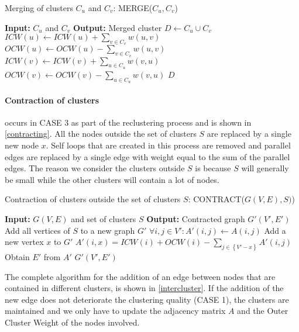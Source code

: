 \begin{algorithm}
\caption{Merging of clusters $C_u$ and $C_v$: MERGE($C_u,C_v$)}
\label{merging}
\begin{algorithmic}
\STATE \textbf{Input:} $C_u$ and $C_v$ 
\STATE \textbf{Output:} Merged cluster
\STATE $D \leftarrow C_u \cup C_v$
	\STATE $ICW(u) \leftarrow ICW(u) + \sum_{v \in C_v}{w(u,v)}$
	\STATE $OCW(u) \leftarrow OCW(u) - \sum_{v \in C_v}{w(u,v)}$
\ENDFOR
{}
	\STATE $ICW(v) \leftarrow ICW(v) + \sum_{u \in C_u}{w(v,u)}$
	\STATE $OCW(v) \leftarrow OCW(v) - \sum_{u \in C_u}{w(v,u)}$
\ENDFOR
\RETURN $D$
\end{algorithmic}
\end{algorithm}

\paragraph{Contraction of clusters} occurs in CASE 3 as part of the reclustering process and is shown in \autoref{contracting}. All the nodes outside the set of clusters $S$ are replaced by a single new node $x$. Self loops that are created in this process are removed and parallel edges are replaced by a single edge with weight equal to the sum of the parallel edges. The reason we consider the clusters outside $S$ is because $S$ will generally be small while the other clusters will contain a lot of nodes.

\begin{algorithm}
\caption{Contraction of clusters outside the set of clusters $S$: CONTRACT($G(V,E),S)$)}
\label{contracting}
\begin{algorithmic}
\STATE \textbf{Input:} $G(V,E)$ and set of clusters $S$ 
\STATE \textbf{Output:} Contracted graph $G'(V',E')$
\STATE Add all vertices of $S$ to a new graph $G'$
\STATE $\forall i,j \in V' : A'(i,j) \leftarrow A(i,j)$
\STATE Add a new vertex $x$ to $G'$
	\STATE $A'(i,x) = ICW(i) + OCW(i) - \sum_{j \in \left\{ V' - x \right\} }{A'(i,j)}$
\ENDFOR
\STATE Obtain $E'$ from $A'$
\RETURN $G'(V',E')$
\end{algorithmic}
\end{algorithm}

The complete algorithm for the addition of an edge between nodes that are contained in different clusters, is shown in \autoref{intercluster}. If the addition of the new edge does not deteriorate the clustering quality (CASE 1), the clusters are maintained and we only have to update the adjacency matrix $A$ and the Outer Cluster Weight of the nodes involved. 

